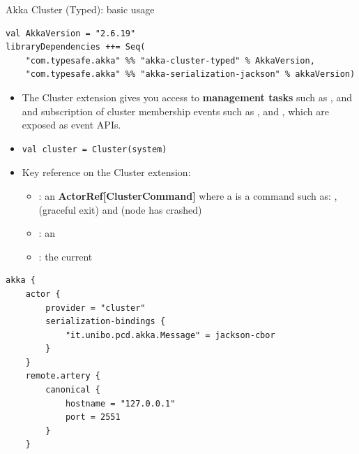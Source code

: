 \documentclass[presentation, 9pt]{beamer}\mode<presentation>{\usetheme{AMSBolognaFC}}
\begin{document}
\begin{frame}{Akka Cluster (Typed): basic usage}

	\begin{tcolorbox}[left=0pt, top=0pt, bottom=0pt, title=build.sbt]
		\begin{verbatim}
val AkkaVersion = "2.6.19"
libraryDependencies ++= Seq(
	"com.typesafe.akka" %% "akka-cluster-typed" % AkkaVersion,
	"com.typesafe.akka" %% "akka-serialization-jackson" % akkaVersion)
	 \end{verbatim}
	 \end{tcolorbox}
	\begin{itemize}
		\item The Cluster extension gives you access to \textbf{management tasks} such as , 
		and  and subscription of cluster membership events such as ,
		 and , which are exposed as event APIs.
		\item[]
		\begin{tcolorbox}[left=0pt, top=0pt, bottom=0pt, title=Access the \textbf{Cluster} extension on a node]
			\begin{verbatim}
val cluster = Cluster(system)
			\end{verbatim}
		\end{tcolorbox}
	 \end{itemize}
	 \begin{itemize}
			\item Key reference on the Cluster extension:
			\begin{itemize}
				\item {}: an \textbf{ActorRef[ClusterCommand]} where a  is a command such
				as: ,  (graceful exit) and  (node has crashed)
				\item {}: an 
				\item {}: the current 
			\end{itemize}	
	\end{itemize}

\begin{tcolorbox}[left=0pt, top=0pt, bottom=0pt, title=Access the \textbf{Cluster} extension on a node]
	\begin{verbatim}
akka {
	actor {
		provider = "cluster"
		serialization-bindings {
			"it.unibo.pcd.akka.Message" = jackson-cbor
		}
	}
	remote.artery {
		canonical {
			hostname = "127.0.0.1"
			port = 2551
		}
	}


\end{verbatim}
\end{tcolorbox}
\end{frame}
\end{document}
